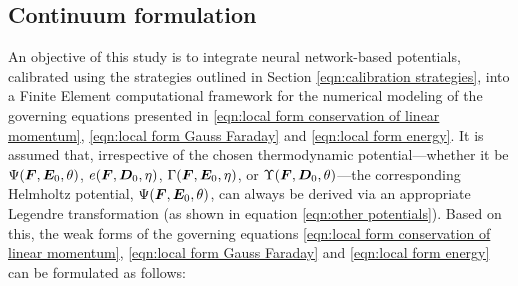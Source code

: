 
\subsection{Continuum formulation}
%
%

An objective of this study is to integrate neural network-based potentials, calibrated using the strategies outlined in Section \ref{eqn:calibration strategies}, into a Finite Element computational framework for the numerical modeling of the governing equations presented in \eqref{eqn:local form conservation of linear momentum},
\eqref{eqn:local form Gauss Faraday} and
\eqref{eqn:local form energy}. It is assumed that, irrespective of the chosen thermodynamic potential—whether it be $\Psi(\boldsymbol{F},\boldsymbol{E}_0,\theta)$, $e(\boldsymbol{F},\boldsymbol{D}_0,\eta)$, $\Gamma(\boldsymbol{F},\boldsymbol{E}_0,\eta)$, or $\Upsilon(\boldsymbol{F},\boldsymbol{D}_0,\theta)$—the corresponding Helmholtz potential, $\Psi(\boldsymbol{F},\boldsymbol{E}_0,\theta)$, can always be derived via an appropriate Legendre transformation (as shown in equation \eqref{eqn:other potentials}). Based on this, the weak forms of the governing equations \eqref{eqn:local form conservation of linear momentum},
\eqref{eqn:local form Gauss Faraday} and
\eqref{eqn:local form energy} can be formulated as follows:



